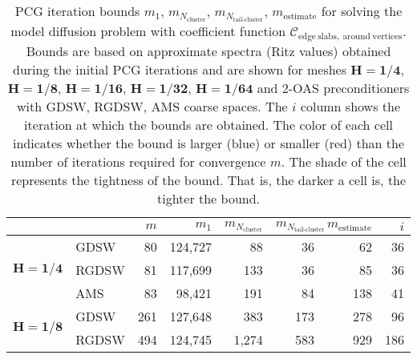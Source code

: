 \begin{table}[H]
\centering
\caption{PCG iteration bounds $m_1$, $m_{N_{\text{cluster}}}$, $m_{N_{\text{tail-cluster}}}$, $m_{\text{estimate}}$ for solving the model diffusion problem with coefficient function $\mathcal{C}_{\mathrm{edge \ slabs, \ around \ vertices}}$. Bounds are based on approximate spectra (Ritz values) obtained during the initial PCG iterations and are shown for meshes $\mathbf{H=1/4}$, $\mathbf{H=1/8}$, $\mathbf{H=1/16}$, $\mathbf{H=1/32}$, $\mathbf{H=1/64}$ and 2-OAS preconditioners with GDSW, RGDSW, AMS coarse spaces. The $i$ column shows the iteration at which the bounds are obtained. The color of each cell indicates whether the bound is larger (blue) or smaller (red) than the number of iterations required for convergence $m$. The shade of the cell represents the tightness of the bound. That is, the darker a cell is, the tighter the bound.}
\label{tab:cg_iteration_bound_coef=slabs_around_vertices}
\begin{tabular}{llrrrrrr}
\toprule
 &  & $m$ & $m_1$ & $m_{N_{\text{cluster}}}$ & $m_{N_{\text{tail-cluster}}}$ & $m_{\text{estimate}}$ & $i$ \\
\midrule
\multirow[c]{3}{*}{$\mathbf{H=1/4}$} & GDSW & 80 & {\cellcolor[HTML]{AFC9F6}} \color[HTML]{000000} 124,727 & {\cellcolor[HTML]{7EAFF1}} \color[HTML]{000000} 88 & {\cellcolor[HTML]{BB9CA9}} \color[HTML]{F1F1F1} 36 & {\cellcolor[HTML]{945357}} \color[HTML]{F1F1F1} 62 & 36 \\
\cline{2-8}
 & RGDSW & 81 & {\cellcolor[HTML]{C1D2F8}} \color[HTML]{000000} 117,699 & {\cellcolor[HTML]{9FC0F4}} \color[HTML]{000000} 133 & {\cellcolor[HTML]{945357}} \color[HTML]{F1F1F1} 36 & {\cellcolor[HTML]{7EAFF1}} \color[HTML]{000000} 85 & 36 \\
\cline{2-8}
 & AMS & 83 & {\cellcolor[HTML]{C9D6F8}} \color[HTML]{000000} 98,421 & {\cellcolor[HTML]{AFC9F6}} \color[HTML]{000000} 191 & {\cellcolor[HTML]{7EAFF1}} \color[HTML]{000000} 84 & {\cellcolor[HTML]{96BCF3}} \color[HTML]{000000} 138 & 41 \\
\cline{1-8} \cline{2-8}
\multirow[c]{3}{*}{$\mathbf{H=1/8}$} & GDSW & 261 & {\cellcolor[HTML]{C1D2F8}} \color[HTML]{000000} 127,648 & {\cellcolor[HTML]{9FC0F4}} \color[HTML]{000000} 383 & {\cellcolor[HTML]{945357}} \color[HTML]{F1F1F1} 173 & {\cellcolor[HTML]{7EAFF1}} \color[HTML]{000000} 278 & 96 \\
\cline{2-8}
 & RGDSW & 494 & {\cellcolor[HTML]{C9D6F8}} \color[HTML]{000000} 124,745 & {\cellcolor[HTML]{AFC9F6}} \color[HTML]{000000} 1,274 & {\cellcolor[HTML]{7EAFF1}} \color[HTML]{000000} 583 & {\cellcolor[HTML]{96BCF3}} \color[HTML]{000000} 929 & 186 \\

\end{tabular}
\end{table}
